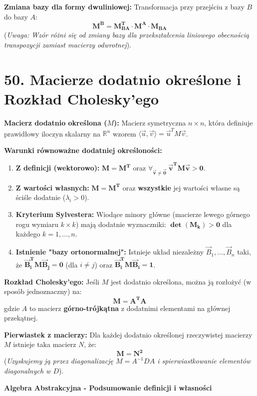 \documentclass[12pt,a4paper]{article}
\begin{document}
\noindent\textbf{Zmiana bazy dla formy dwuliniowej:} Transformacja przy przejściu z bazy $B$ do bazy $A$: %
$$ \mathbf{M^B = M_{BA}^T \cdot M^A \cdot M_{BA}} $$ %
(\textit{Uwaga: Wzór różni się od zmiany bazy dla przekształcenia liniowego obecnością transpozycji zamiast macierzy odwrotnej}). %

\section*{50. Macierze dodatnio określone i Rozkład Cholesky'ego}
\noindent\textbf{Macierz dodatnio określona ($M$):} Macierz symetryczna $n \times n$, która definiuje prawidłowy iloczyn skalarny na $\mathbb{R}^n$ wzorem $\langle \vec{u}, \vec{v} \rangle = \vec{u}^T M \vec{v}$. %

\noindent\textbf{Warunki równoważne dodatniej określoności:} %
\begin{enumerate}
    \item \textbf{Z definicji (wektorowo):} $\mathbf{M = M^T}$ oraz $\mathbf{\forall_{\vec{v} \neq \vec{0}} \ \vec{v}^T M \vec{v} > 0}$. %
    \item \textbf{Z wartości własnych:} $\mathbf{M = M^T}$ oraz \textbf{wszystkie} jej wartości własne są ściśle dodatnie ($\lambda_i > 0$). %
    \item \textbf{Kryterium Sylvestera:} Wiodące minory główne (macierze lewego górnego rogu wymiaru $k \times k$) mają dodatnie wyznaczniki: $\mathbf{\det(M_k) > 0}$ dla każdego $k=1,\dots,n$. %
    \item \textbf{Istnienie "bazy ortonormalnej":} Istnieje układ niezależny $\vec{B}_1, \dots, \vec{B}_n$ taki, że $\mathbf{\vec{B}_i^T M \vec{B}_j = 0}$ (dla $i \neq j$) oraz $\mathbf{\vec{B}_i^T M \vec{B}_i = 1}$. %
\end{enumerate}

\noindent\textbf{Rozkład Cholesky'ego:} Jeśli $M$ jest dodatnio określona, można ją rozłożyć (w sposób jednoznaczny) na: %
$$ \mathbf{M = A^T A} $$ %
gdzie $A$ to macierz \textbf{górno-trójkątna} z dodatnimi elementami na głównej przekątnej. %

\noindent\textbf{Pierwiastek z macierzy:} Dla każdej dodatnio określonej rzeczywistej macierzy $M$ istnieje taka macierz $N$, że: %
$$ \mathbf{M = N^2} $$ %
(\textit{Uzyskujemy ją przez diagonalizację $M = A^{-1}DA$ i spierwiastkowanie elementów diagonalnych w $D$}). %
\\

\newpage
\begin{center}
    \Huge \textbf{Algebra Abstrakcyjna - Podsumowanie definicji i własności} \\
    \vspace{0.5cm}
\end{center}
\vspace{0.5cm}
\end{document}
